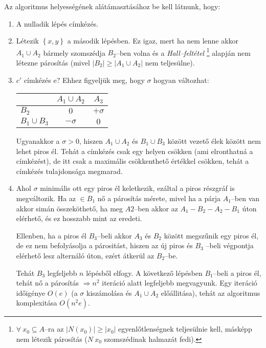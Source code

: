 Az algoritmus helyességének alátámasztásához be kell látnunk, hogy:

\begin{enumerate}
  \item A nulladik lépés címkézés.
  \item Létezik $\left\{x,y\right\}$ a második lépésben. Ez igaz, mert ha nem
  lenne akkor $A_1 \cup A_2$ bármely szomszédja $B_2$--ben volna és a
  \emph{Hall--feltétel} \footnote{$ \forall~x_0 \subseteq A$--ra az $|N(x_0)|
  \geq |x_0|$ egyenlőtlenségnek teljesülnie kell, másképp nem létezik párosítás
  ($N~x_0$ szomszédinak halmazát fedi).} alapján nem létezne párosítás 
  (mivel $|B_2| \geq |A_1 \cup A_2|$ nem teljesülne).
  \item $c'$ címkézés e? Ehhez figyeljük meg, hogy $\sigma$ hogyan változhat:
  
  \begin{tabular}{ l |  c c }
                  & $A_1 \cup A_2$ & $A_3$ \\
                  \hline
  $B_2$           & $0$            & $+\sigma$ \\
  $B_1 \cup B_3$ & $-\sigma$      & $0$ \\
  \end{tabular}
  
  Ugyanakkor a $\sigma > 0 $, hiszen $A_1 \cup A_2$ és $B_1 \cup B_3$ között
  vezető élek között nem lehet piros él. Tehát a címkézés csak egy helyen
  csökken (ami elronthatná a címkézést), de itt csak a maximális csökkenthető értékkel
  csökken, tehát a címkézés tulajdonsága megmarad.
 
  \item Ahol $\sigma$ minimális ott egy piros él keletkezik, ezáltal a piros
  részgráf is megváltozik. Ha az $\in B_1$ nő a párosítás mérete, mivel ha a
  párja $A_1$--ben van akkor simán összeköthető, ha meg $A2$--ben akkor az
  $A_1-B_2-A_2-B_1$ úton elérhető, és ez hosszabb mint az eredeti. 
  
  Ellenben, ha a piros él $B_3$--beli akkor $A_3$ és $B_2$ között megszűnik egy
  piros él, de ez nem befolyásolja a párositást, hiszen az új piros és $B_3$
  --beli végpontja elérhető lesz alternáló úton, ezért átkerül az $B_2$--be.
  
  Tehát $B_3$ legfeljebb $n$ lépésből elfogy. A  következő lépésben $B_1$--beli
  a piros él, tehát nő a párosítás $\Rightarrow n^2$ iteráció alatt legfeljebb
  megvagyunk. Egy iteráció időigénye $O(e)$ (a $\sigma$ kiszámolása és $A_1 \cup
  A_2$ előállitása), tehát az algoritmus komplexitása $O(n^2e)$.
  \end{enumerate}
